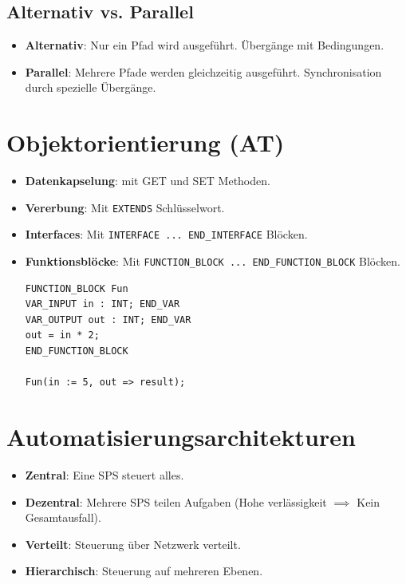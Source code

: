 \documentclass[9pt, landscape]{article}
\newcommand{\algo}[1]{\textbf{\textcolor{blue!60!black}{#1}}}
\newcommand{\datastruct}[1]{\textbf{\textcolor{red!60!black}{#1}}}
\begin{document}
\begin{multicols*}{4}
\subsection*{Alternativ vs. Parallel}

\begin{itemize}
    \item \algo{Alternativ}: Nur ein Pfad wird ausgeführt. Übergänge mit Bedingungen.
    \item \algo{Parallel}: Mehrere Pfade werden gleichzeitig ausgeführt. Synchronisation durch spezielle Übergänge.
\end{itemize}

\section{Objektorientierung (AT)}
\begin{itemize}
    \item \datastruct{Datenkapselung}: mit GET und SET Methoden.
    \item \datastruct{Vererbung}: Mit \lstinline|EXTENDS| Schlüsselwort.
    \item \datastruct{Interfaces}: Mit \lstinline|INTERFACE ... END_INTERFACE| Blöcken.
\item \datastruct{Funktionsblöcke}: {\sloppy Mit \lstinline|FUNCTION_BLOCK ... END_FUNCTION_BLOCK| Blöcken.}
    \begin{lstlisting}[language=ST, numbers=none]
FUNCTION_BLOCK Fun
VAR_INPUT in : INT; END_VAR
VAR_OUTPUT out : INT; END_VAR
out = in * 2;
END_FUNCTION_BLOCK

Fun(in := 5, out => result);

    \end{lstlisting}
\end{itemize}

\section{Automatisierungsarchitekturen}

\begin{itemize}
    \item \datastruct{Zentral}: Eine SPS steuert alles.
    \item \datastruct{Dezentral}: Mehrere SPS teilen Aufgaben (Hohe verlässigkeit $\implies$ Kein Gesamtausfall).
    \item \datastruct{Verteilt}: Steuerung über Netzwerk verteilt.
    \item \datastruct{Hierarchisch}: Steuerung auf mehreren Ebenen.
\end{itemize}


\end{multicols*}
\end{document}
